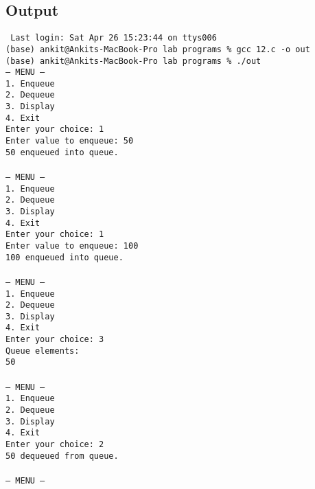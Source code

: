 \documentclass[12pt,a4paper]{article}
\begin{document}
\newpage

\subsection*{Output}
\begin{tcolorbox}[terminalstyle, title=Sample Output]
\texttt{
Last login: Sat Apr 26 15:23:44 on ttys006\\
(base) ankit@Ankits-MacBook-Pro lab programs \% gcc 12.c -o out\\
(base) ankit@Ankits-MacBook-Pro lab programs \% ./out\\
--- MENU ---\\
1. Enqueue\\
2. Dequeue\\
3. Display\\
4. Exit\\
Enter your choice: 1\\
Enter value to enqueue: 50\\
50 enqueued into queue.\\
\\
--- MENU ---\\
1. Enqueue\\
2. Dequeue\\
3. Display\\
4. Exit\\
Enter your choice: 1\\
Enter value to enqueue: 100\\
100 enqueued into queue.\\
\\
--- MENU ---\\
1. Enqueue\\
2. Dequeue\\
3. Display\\
4. Exit\\
Enter your choice: 3\\
Queue elements:\\
50 \\
\\
--- MENU ---\\
1. Enqueue\\
2. Dequeue\\
3. Display\\
4. Exit\\
Enter your choice: 2\\
50 dequeued from queue.\\
\\
--- MENU ---\\
}
\end{tcolorbox}
\end{document}
